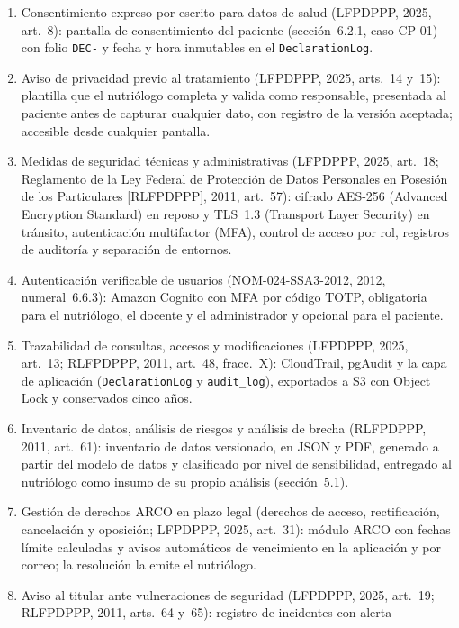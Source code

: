 \documentclass[12pt, a4paper]{article}
\begin{document}
\begingroup\sloppy
\begin{enumerate}[label=\Roman*.]
  \item Consentimiento expreso por escrito para datos de salud
    (LFPDPPP, 2025, art.~8): pantalla de
    consentimiento del paciente (sección~6.2.1, caso CP-01) con folio
    \texttt{DEC-} y fecha y hora inmutables en el \texttt{DeclarationLog}.
  \item Aviso de privacidad previo al tratamiento (LFPDPPP, 2025,
    arts.~14 y~15): plantilla que el nutriólogo completa y valida como
    responsable, presentada al paciente antes de capturar cualquier dato,
    con registro de la versión aceptada; accesible desde cualquier
    pantalla.
  \item Medidas de seguridad técnicas y administrativas (LFPDPPP, 2025,
    art.~18; Reglamento de la Ley Federal de Protección de Datos Personales en Posesión de los Particulares [RLFPDPPP], 2011, art.~57): cifrado AES-256 (Advanced Encryption Standard) en reposo y TLS~1.3 (Transport Layer Security) en
    tránsito, autenticación multifactor (MFA), control de acceso por rol, registros de auditoría y
    separación de entornos.
  \item Autenticación verificable de usuarios (NOM-024-SSA3-2012, 2012,
    numeral~6.6.3): Amazon Cognito con MFA por código TOTP, obligatoria
    para el nutriólogo, el docente y el administrador y opcional para el
    paciente.
  \item Trazabilidad de consultas, accesos y modificaciones (LFPDPPP, 2025,
    art.~13; RLFPDPPP, 2011, art.~48, fracc.~X): CloudTrail, pgAudit y la capa de aplicación
    (\texttt{DeclarationLog} y \texttt{audit\_log}), exportados a S3 con
    Object Lock y conservados cinco años.
  \item Inventario de datos, análisis de riesgos y análisis de brecha
    (RLFPDPPP, 2011, art.~61): inventario de datos versionado, en JSON y
    PDF, generado a partir del modelo de datos y clasificado por nivel
    de sensibilidad, entregado al nutriólogo como insumo de su propio
    análisis (sección~5.1).
  \item Gestión de derechos ARCO en plazo legal (derechos de acceso, rectificación, cancelación y oposición; LFPDPPP, 2025,
    art.~31): módulo ARCO con fechas límite calculadas y avisos
    automáticos de vencimiento en la aplicación y por correo; la
    resolución la emite el nutriólogo.
  \item Aviso al titular ante vulneraciones de seguridad (LFPDPPP, 2025,
    art.~19; RLFPDPPP, 2011, arts.~64 y~65): registro de incidentes con alerta

\end{enumerate}
\end{document}
